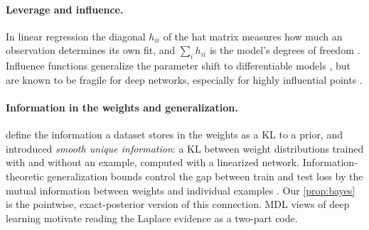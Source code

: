 \documentclass[10pt,twocolumn,letterpaper]{article}
\theoremstyle{definition}
\begin{document}
\paragraph{Leverage and influence.} In linear regression the diagonal $h_{ii}$ of the hat matrix measures how much an observation determines its own fit, and $\sum_i h_{ii}$ is the model's degrees of freedom \citep{hoaglin1978,cook1977}. Influence functions generalize the parameter shift to differentiable models \citep{koh2017}, but are known to be fragile for deep networks, especially for highly influential points \citep{basu2021,bae2022}.

\paragraph{Information in the weights and generalization.} \citet{achille2019} define the information a dataset stores in the weights as a KL to a prior, and \citet{harutyunyan2021} introduced \emph{smooth unique information}: a KL between weight distributions trained with and without an example, computed with a linearized network. Information-theoretic generalization bounds control the gap between train and test loss by the mutual information between weights and individual examples \citep{xu2017,bu2020}. Our \cref{prop:bayes} is the pointwise, exact-posterior version of this connection. MDL views of deep learning \citep{hinton1993,blier2018} motivate reading the Laplace evidence as a two-part code.
\end{document}
